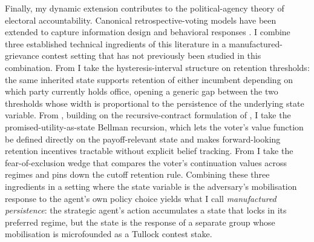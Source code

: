 \documentclass[11pt,twoside]{extarticle}
\begin{document}


Finally, my dynamic extension contributes to the political-agency theory of electoral accountability. Canonical retrospective-voting models \citep*{barroControlPoliticiansEconomic1973,ferejohnIncumbentPerformanceElectoral1986} have been extended to capture information design \citep*{banksRepeatedElectionsModel1993,przeworskiDemocracyAccountabilityRepresentation1999,sandroniWhenConfrontRole2018a,acharyaPoliticalAccountabilityMoral2025} and behavioral responses \citep*{levyCorrelationNeglectVoting2015,ortolevaOverconfidencePoliticalBehavior2015,liElectoralAccountabilitySelection2023,vaethVoterLearningUnidimensional2023}. I combine three established technical ingredients of this literature in a manufactured-grievance contest setting that has not previously been studied in this combination. From \citet{coatePolicyPersistence1999} I take the hysteresis-interval structure on retention thresholds: the same inherited state supports retention of either incumbent depending on which party currently holds office, opening a generic gap between the two thresholds whose width is proportional to the persistence of the underlying state variable. From \citet{acharyaPoliticalAccountabilityMoral2025}, building on the recursive-contract formulation of \citet{spearOnRepeatedMoralHazard1987}, I take the promised-utility-as-state Bellman recursion, which lets the voter's value function be defined directly on the payoff-relevant state and makes forward-looking retention incentives tractable without explicit belief tracking. From \citet{padróimiquelControlPoliticiansDivided2007} I take the fear-of-exclusion wedge that compares the voter's continuation values across regimes and pins down the cutoff retention rule. Combining these three ingredients in a setting where the state variable is the adversary's mobilisation response to the agent's own policy choice yields what I call \emph{manufactured persistence}: the strategic agent's action accumulates a state that locks in its preferred regime, but the state is the response of a separate group whose mobilisation is microfounded as a Tullock contest stake.
\end{document}

